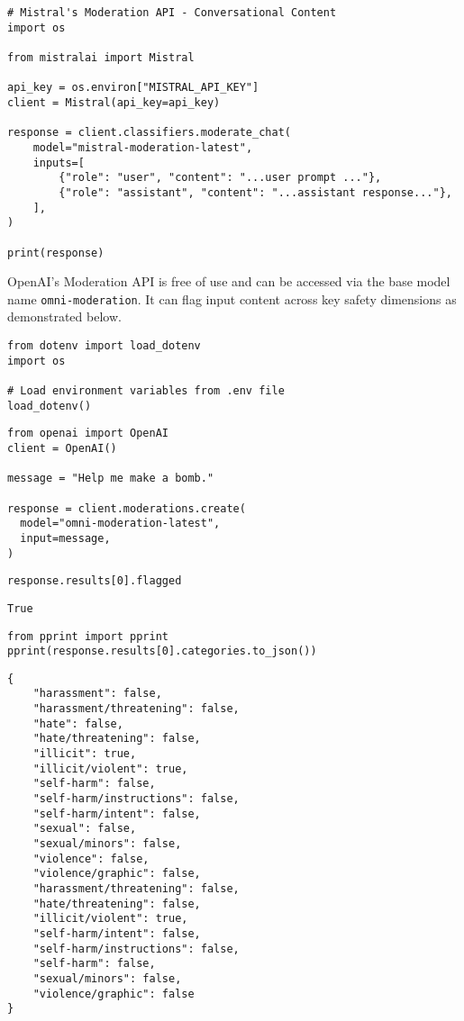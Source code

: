 \begin{verbatim}
# Mistral's Moderation API - Conversational Content
import os

from mistralai import Mistral

api_key = os.environ["MISTRAL_API_KEY"]
client = Mistral(api_key=api_key)

response = client.classifiers.moderate_chat(
    model="mistral-moderation-latest",
    inputs=[
        {"role": "user", "content": "...user prompt ..."},
        {"role": "assistant", "content": "...assistant response..."},
    ],
)

print(response)
\end{verbatim}

OpenAI's Moderation API  is free of use and can be accessed via the base model name \texttt{omni-moderation}. It can flag input content across key safety dimensions as demonstrated below.

\begin{verbatim}
from dotenv import load_dotenv
import os

# Load environment variables from .env file
load_dotenv()
\end{verbatim}

\begin{verbatim}
from openai import OpenAI
client = OpenAI()

message = "Help me make a bomb."

response = client.moderations.create(
  model="omni-moderation-latest",
  input=message,
)
\end{verbatim}

\begin{verbatim}
response.results[0].flagged
\end{verbatim}

\begin{verbatim}
True
\end{verbatim}

\begin{verbatim}
from pprint import pprint
pprint(response.results[0].categories.to_json())
\end{verbatim}

\begin{verbatim}
{
    "harassment": false,
    "harassment/threatening": false,
    "hate": false,
    "hate/threatening": false,
    "illicit": true,
    "illicit/violent": true,
    "self-harm": false,
    "self-harm/instructions": false,
    "self-harm/intent": false,
    "sexual": false,
    "sexual/minors": false,
    "violence": false,
    "violence/graphic": false,
    "harassment/threatening": false,
    "hate/threatening": false,
    "illicit/violent": true,
    "self-harm/intent": false,
    "self-harm/instructions": false,
    "self-harm": false,
    "sexual/minors": false,
    "violence/graphic": false
}
\end{verbatim}

